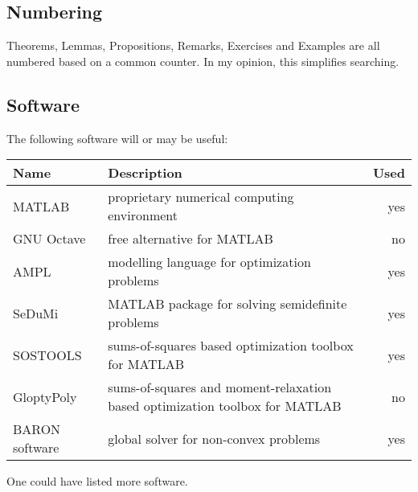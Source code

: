 \subsection{Numbering}

Theorems, Lemmas, Propositions, Remarks, Exercises and Examples are all numbered based on a common counter. In my opinion, this simplifies searching. 

\subsection{Software}

The following software will or may be useful:

\begin{center}
\begin{tabular}{lp{10cm}r}
	\textbf{Name} & \textbf{Description} & \textbf{Used}
	\\ \hline MATLAB & proprietary numerical computing environment & yes
	\\ GNU Octave & free alternative for MATLAB & no
	\\ \hline AMPL & modelling language for optimization problems & yes
	\\ \hline SeDuMi & MATLAB package for solving semidefinite problems & yes
	\\ \hline SOSTOOLS & sums-of-squares based optimization toolbox for MATLAB & yes
	\\ GloptyPoly & sums-of-squares and moment-relaxation based optimization toolbox for MATLAB & no
	\\ \hline BARON software &  global solver for non-convex problems & yes
\end{tabular}
\end{center}

One could have listed more software.

